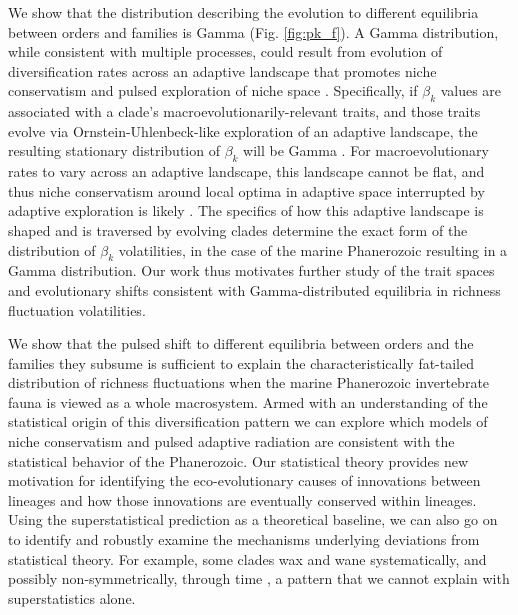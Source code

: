 \documentclass[12pt]{article}
\let\citep=\cite
\begin{document}
We show that the distribution describing the evolution to different
equilibria between orders and families is Gamma (Fig. \ref{fig:pk_f}).
A Gamma distribution, while consistent with multiple processes, could
result from evolution of diversification rates across an adaptive
landscape that promotes niche conservatism and pulsed exploration of
niche space \citep{cir1985}.  Specifically, if $\beta_k$ values are
associated with a clade's macroevolutionarily-relevant traits, and
those traits evolve via Ornstein-Uhlenbeck-like exploration of an
adaptive landscape, the resulting stationary distribution of $\beta_k$
will be Gamma \citep{cir1985}.  For macroevolutionary rates to vary
across an adaptive landscape, this landscape cannot be flat, and thus
niche conservatism around local optima in adaptive space interrupted
by adaptive exploration is likely \citep{newman1985adaptive,
  gavrilets2004book}. The specifics of how this adaptive landscape is
shaped and is traversed by evolving clades determine the exact form of
the distribution of $\beta_k$ volatilities, in the case of the marine
Phanerozoic resulting in a Gamma distribution. Our work thus motivates
further study of the trait spaces and evolutionary shifts consistent
with Gamma-distributed equilibria in richness fluctuation
volatilities.

We show that the pulsed shift to different equilibria between orders
and the families they subsume is sufficient to explain the
characteristically fat-tailed distribution of richness fluctuations
when the marine Phanerozoic invertebrate fauna is viewed as a whole
macrosystem.  Armed with an understanding of the statistical origin of
this diversification pattern we can explore which models of niche
conservatism and pulsed adaptive radiation are consistent with the
statistical behavior of the Phanerozoic. Our statistical theory
provides new motivation for identifying the eco-evolutionary causes of
innovations between lineages and how those innovations are eventually
conserved within lineages. Using the superstatistical prediction as a
theoretical baseline, we can also go on to identify and robustly
examine the mechanisms underlying deviations from statistical
theory. For example, some clades wax and wane systematically, and
possibly non-symmetrically, through time \citep{liow2007,
  foote2008paleobiol, quental2013}, a pattern that we cannot explain
with superstatistics alone.
\end{document}

